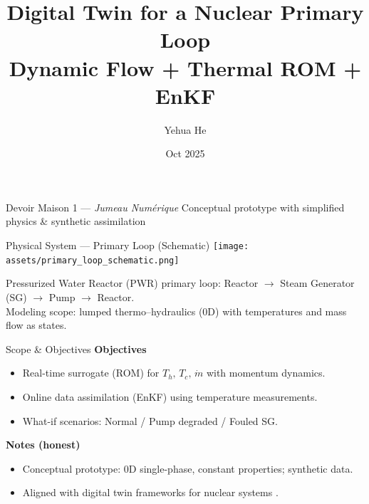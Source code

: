\documentclass[aspectratio=169]{beamer}
\title[Digital Twin (Energy)]{Digital Twin for a Nuclear Primary Loop\\ \small Dynamic Flow + Thermal ROM + EnKF}
\author{Yehua He}
\institute{M2 ROM \& Data-Driven ROM — Université de Strasbourg}
\date{Oct 2025}
\begin{document}
\begin{frame}
  \titlepage
  \vspace{-0.5em}
  \footnotesize
  Devoir Maison 1 — \textit{Jumeau Numérique} \hfill
  Conceptual prototype with simplified physics \& synthetic assimilation
\end{frame}

\begin{frame}{Physical System — Primary Loop (Schematic)}
\centering
\texttt{[image: assets/primary\_loop\_schematic.png]}

\vspace{0.6em}
\footnotesize
Pressurized Water Reactor (PWR) primary loop: Reactor $\rightarrow$ Steam Generator (SG) $\rightarrow$ Pump $\rightarrow$ Reactor.\\
Modeling scope: lumped thermo–hydraulics (0D) with temperatures and mass flow as states.
\end{frame}

\begin{frame}{Scope \& Objectives}
\textbf{Objectives}
\begin{itemize}
  \item Real-time surrogate (ROM) for $T_h,\,T_c,\,\dot m$ with momentum dynamics.
  \item Online data assimilation (EnKF) using temperature measurements.
  \item What-if scenarios: Normal / Pump degraded / Fouled SG.
\end{itemize}

\textbf{Notes (honest)}
\begin{itemize}
  \item Conceptual prototype: 0D single-phase, constant properties; synthetic data.
  \item Aligned with digital twin frameworks for nuclear systems \cite{Liu2024_DigitalTwinNuclear,NRC2021_DigitalTwinChallenges}.
\end{itemize}
\end{frame}
\end{document}
